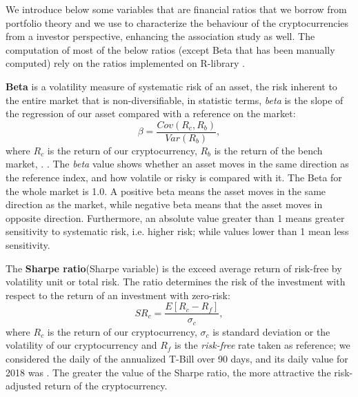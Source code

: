 \documentclass{bmcart}
\begin{document}
We introduce below some variables that are financial ratios \cite{bacon2008practical} that we borrow from portfolio theory and we use to characterize the behaviour of the cryptocurrencies from a investor perspective, enhancing the association study as well. The computation of most of the below ratios (except Beta that has been manually computed) rely on the ratios implemented on R-library \cite{PerformanceAnalytics}. 

\textbf{Beta} is a volatility measure of systematic risk of an asset, the risk inherent to the entire market that is non-diversifiable, in statistic terms, \textit{beta} is the slope of the regression of our asset compared with a reference on the market:
\begin{equation}
	\beta = \frac{Cov(R_c,R_b)}{Var(R_b)}, 
\end{equation}
where $R_c$ is the return of our cryptocurrency, $R_b$ is the return of the bench market,  . . The \textit{beta} value shows whether an asset  moves in the same direction as the reference index, and how volatile or risky is compared with it. The Beta for the whole market is 1.0. A positive beta means the asset moves in the same direction as the market, while negative beta means that the asset moves in opposite direction. Furthermore, an absolute value greater than 1 means greater sensitivity to systematic risk, i.e. higher risk; while values lower than 1 mean less sensitivity. 

The \textbf{Sharpe ratio}(Sharpe variable)  is the exceed average return of risk-free by volatility unit or total risk. The ratio  determines the risk of the investment with respect to the return of an investment with zero-risk:
\begin{equation}
	\label{eq: Sharp}
	SR_c =\frac{E[R_{c}-R_{f}]}{\sigma_c},
\end{equation}
where $R_c$ is the return of our cryptocurrency,  $\sigma_c$ is standard deviation or the volatility of our cryptocurrency and $R_f$ is the \textit{risk-free} rate taken as reference; we considered the daily of the annualized T-Bill over 90 days, and its daily value for 2018 was  . The greater the value of the Sharpe ratio, the more attractive the risk-adjusted return of the cryptocurrency.
\end{document}
